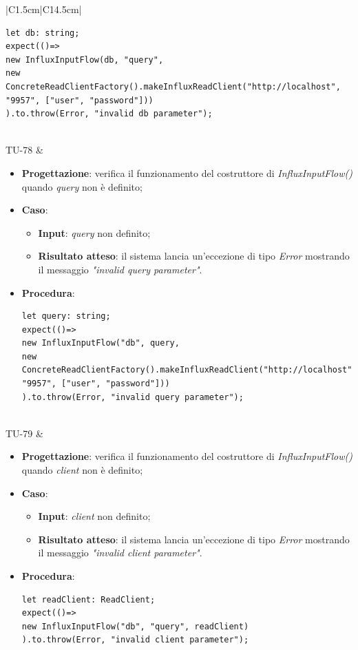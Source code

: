 \begin{longtable}{|C{1.5cm}|C{14.5cm}|}
\begin{itemize}
\begin{lstlisting}
let db: string;
expect(()=> 
new InfluxInputFlow(db, "query", 
new ConcreteReadClientFactory().makeInfluxReadClient("http://localhost", "9957", ["user", "password"]))
).to.throw(Error, "invalid db parameter");
	\end{lstlisting}
\end{itemize}\\
\hline
{TU-78} &
\begin{itemize}
	\item \textbf{Progettazione}: verifica il funzionamento del costruttore di \emph{InfluxInputFlow()} quando \emph{query} non è definito;
	\item \textbf{Caso}: 
	\begin{itemize}
		\item \textbf{Input}: \emph{query} non definito;
		\item \textbf{Risultato atteso}: il sistema lancia un'eccezione di tipo \emph{Error} mostrando il messaggio \emph{"invalid query parameter"}.
	\end{itemize}
	\item \textbf{Procedura}:
	\begin{lstlisting}
let query: string;
expect(()=> 
new InfluxInputFlow("db", query, 
new ConcreteReadClientFactory().makeInfluxReadClient("http://localhost", "9957", ["user", "password"]))
).to.throw(Error, "invalid query parameter");
	\end{lstlisting}
\end{itemize}\\
\hline
{TU-79} &
\begin{itemize}
	\item \textbf{Progettazione}: verifica il funzionamento del costruttore di \emph{InfluxInputFlow()} quando \emph{client} non è definito;
	\item \textbf{Caso}: 
	\begin{itemize}
		\item \textbf{Input}: \emph{client} non definito;
		\item \textbf{Risultato atteso}: il sistema lancia un'eccezione di tipo \emph{Error} mostrando il messaggio \emph{"invalid client parameter"}.
	\end{itemize}
	\item \textbf{Procedura}:
	\begin{lstlisting}
let readClient: ReadClient;
expect(()=> 
new InfluxInputFlow("db", "query", readClient)
).to.throw(Error, "invalid client parameter");
	\end{lstlisting}
\end{itemize}\\

\end{longtable}
